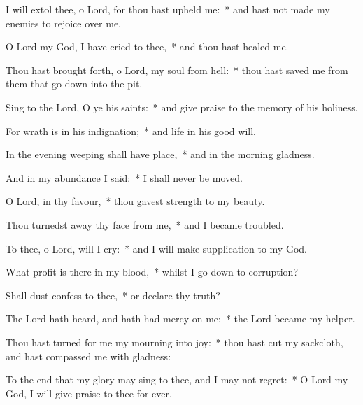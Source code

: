 \begin{enpars}
\item I will extol thee, o Lord, for thou hast upheld me:~* and hast not made my enemies to rejoice over me.
\item O Lord my God, I have cried to thee,~* and thou hast healed me.
\item Thou hast brought forth, o Lord, my soul from hell:~* thou hast saved me from them that go down into the pit.
\item Sing to the Lord, O ye his saints:~* and give praise to the memory of his holiness.
\item For wrath is in his indignation;~* and life in his good will.
\item In the evening weeping shall have place,~* and in the morning gladness.
\item And in my abundance I said:~* I shall never be moved.
\item O Lord, in thy favour,~* thou gavest strength to my beauty.
\item Thou turnedst away thy face from me,~* and I became troubled.
\item To thee, o Lord, will I cry:~* and I will make supplication to my God.
\item What profit is there in my blood,~* whilst I go down to corruption?
\item Shall dust confess to thee,~* or declare thy truth?
\item The Lord hath heard, and hath had mercy on me:~* the Lord became my helper.
\item Thou hast turned for me my mourning into joy:~* thou hast cut my sackcloth, and hast compassed me with gladness:
\item To the end that my glory may sing to thee, and I may not regret:~* O Lord my God, I will give praise to thee for ever.
\end{enpars}
